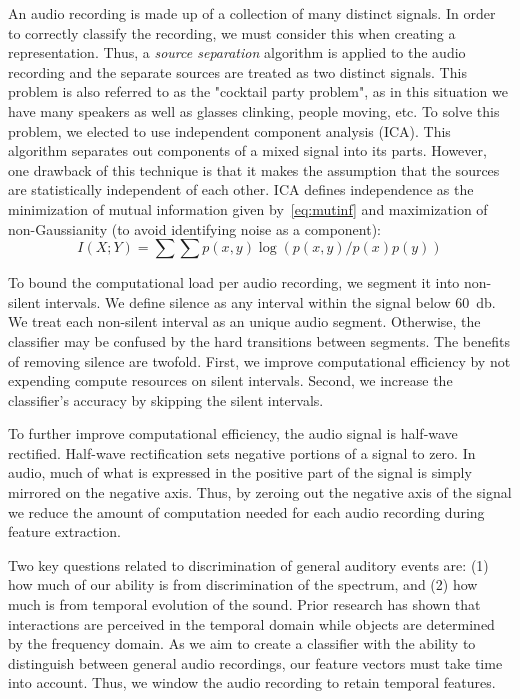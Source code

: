 %
An audio recording is made up of a collection of many distinct signals.
%
In order to correctly classify the recording, we must consider this when
creating a representation. 
%
Thus, a \textit{source separation} algorithm is applied to the audio recording
and the separate sources are treated as two distinct signals. 
%
This problem is also referred to as the "cocktail party problem", as in this
situation we have many speakers as well as glasses clinking, people moving, etc.
% 
To solve this problem, we elected to use independent component analysis (ICA).
%
This algorithm separates out components of a mixed signal into its parts.
%
However, one drawback of this technique is that it makes the assumption that 
the sources are statistically independent of each other. 
%
ICA defines independence as the minimization of mutual information given
by~\cref{eq:mutinf} and maximization of non-Gaussianity (to avoid identifying
noise as a component):
\begin{equation} \label{eq:mutinf}
    I(X;Y) = \sum\sum p(x,y)\log(p(x,y)/p(x)p(y))
\end{equation}
%

%
To bound the computational load per audio recording, we segment it into
non-silent intervals.
%
We define silence as any interval within the signal below 60~db. 
%
We treat each non-silent interval as an unique audio segment.
%
Otherwise, the classifier may be confused by the hard transitions between
segments.
%
The benefits of removing silence are twofold.
%
First, we improve computational efficiency by not expending compute resources 
on silent intervals.
%
Second, we increase the classifier's accuracy by skipping the silent intervals.

%
To further improve computational efficiency, the audio signal is half-wave
rectified.
%
Half-wave rectification sets negative portions of a signal to zero. 
%
In audio, much of what is expressed in the positive part of the signal is 
simply mirrored on the negative axis. 
%
Thus, by zeroing out the negative axis of the signal we reduce the amount of
computation needed for each audio recording during feature extraction.

%
Two key questions related to discrimination of general auditory events are: 
(1) how much of our ability is from discrimination of the spectrum, and 
(2) how much is from temporal evolution of the sound.
%
Prior research has shown that interactions are perceived in the temporal domain
while objects are determined by the frequency domain. 
%
As we aim to create a classifier with the ability to distinguish between 
general audio recordings, our feature vectors must take time into account. 
%
Thus, we window the audio recording to retain temporal features.

